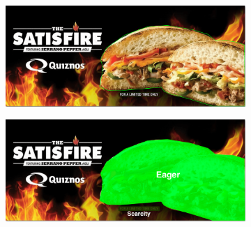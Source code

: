 \documentclass[hidelinks,11pt,a4paper]{report}
\begin{document}
\begin{figure}[!h]
    \centering
    \begin{subfigure}[b]{0.4\textwidth}
        \includegraphics[scale=0.2]{images/Image1.png}
    \end{subfigure}
    \begin{subfigure}[b]{0.4\textwidth}
        \includegraphics[scale=0.2]{images/Image1_Segment.png}




\end{subfigure}
\end{figure}
\end{document}
